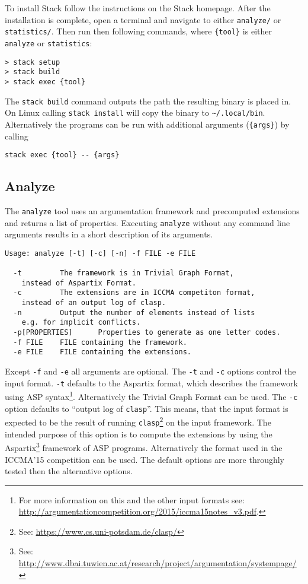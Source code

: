 \documentclass[parskip=half]{scrartcl}
\begin{document}
To install Stack follow the instructions on the Stack homepage.
After the installation is complete, open a terminal and navigate to either
\texttt{analyze/} or \texttt{statistics/}. Then run then following
commands, where \texttt{\{tool\}} is either \texttt{analyze} or
\texttt{statistics}:
\begin{verbatim}
> stack setup
> stack build
> stack exec {tool}
\end{verbatim}

The \texttt{stack build} command outputs the path the resulting binary
is placed in. On Linux calling \texttt{stack install} will copy the binary
to \texttt{\~{}/.local/bin}. Alternatively the programs can be run with
additional arguments (\texttt{\{args\}}) by calling
\begin{verbatim}
stack exec {tool} -- {args}
\end{verbatim}

\subsection{Analyze}

The \texttt{analyze} tool uses an argumentation framework and precomputed
extensions and returns a list of properties. Executing \texttt{analyze}
without any command line arguments results in a short description of
its arguments.

\begin{verbatim}
Usage: analyze [-t] [-c] [-n] -f FILE -e FILE

  -t         The framework is in Trivial Graph Format,
    instead of Aspartix Format.
  -c         The extensions are in ICCMA competiton format,
    instead of an output log of clasp.
  -n         Output the number of elements instead of lists
    e.g. for implicit conflicts.
  -p[PROPERTIES]      Properties to generate as one letter codes.
  -f FILE    FILE containing the framework.
  -e FILE    FILE containing the extensions.
\end{verbatim}

Except \texttt{-f} and \texttt{-e} all arguments are optional.  The \texttt{-t}
and \texttt{-c} options control the input format. \texttt{-t} defaults to the
Aspartix format, which describes the framework using ASP syntax\footnote{For
    more information on this and the other input formats see:
\url{http://argumentationcompetition.org/2015/iccma15notes_v3.pdf}.}.
Alternatively the Trivial Graph Format can be used. The \texttt{-c} option
defaults to ``output log of \texttt{clasp}''. This means, that the input format is
expected to be the result of running \texttt{clasp}\footnote{See:
\url{https://www.cs.uni-potsdam.de/clasp/}} on the input framework. The intended
purpose of this option is to compute the extensions by using the
Aspartix\footnote{See:
\url{http://www.dbai.tuwien.ac.at/research/project/argumentation/systempage/}}
framework of ASP programs. Alternatively the format used in the ICCMA'15
competition can be used. The default options are more throughly tested then the
alternative options.
\end{document}
